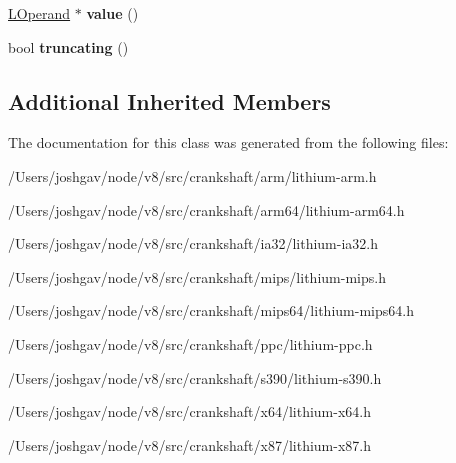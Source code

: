 \begin{DoxyCompactItemize}
\item 
\hyperlink{classv8_1_1internal_1_1_l_operand}{L\+Operand} $\ast$ {\bfseries value} ()\hypertarget{classv8_1_1internal_1_1_l_tagged_to_i_af847eb991b1b476ad690972a7266618d}{}\label{classv8_1_1internal_1_1_l_tagged_to_i_af847eb991b1b476ad690972a7266618d}

\item 
bool {\bfseries truncating} ()\hypertarget{classv8_1_1internal_1_1_l_tagged_to_i_abb946d8222ed5fd6b32d2f5f99cbe24b}{}\label{classv8_1_1internal_1_1_l_tagged_to_i_abb946d8222ed5fd6b32d2f5f99cbe24b}

\end{DoxyCompactItemize}
\subsection*{Additional Inherited Members}


The documentation for this class was generated from the following files\+:\begin{DoxyCompactItemize}
\item 
/\+Users/joshgav/node/v8/src/crankshaft/arm/lithium-\/arm.\+h\item 
/\+Users/joshgav/node/v8/src/crankshaft/arm64/lithium-\/arm64.\+h\item 
/\+Users/joshgav/node/v8/src/crankshaft/ia32/lithium-\/ia32.\+h\item 
/\+Users/joshgav/node/v8/src/crankshaft/mips/lithium-\/mips.\+h\item 
/\+Users/joshgav/node/v8/src/crankshaft/mips64/lithium-\/mips64.\+h\item 
/\+Users/joshgav/node/v8/src/crankshaft/ppc/lithium-\/ppc.\+h\item 
/\+Users/joshgav/node/v8/src/crankshaft/s390/lithium-\/s390.\+h\item 
/\+Users/joshgav/node/v8/src/crankshaft/x64/lithium-\/x64.\+h\item 
/\+Users/joshgav/node/v8/src/crankshaft/x87/lithium-\/x87.\+h\end{DoxyCompactItemize}
